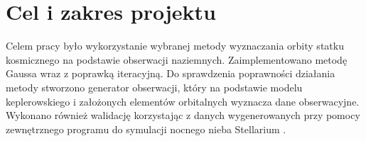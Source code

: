 \clearpage %
\section{Cel i zakres projektu}

Celem pracy było wykorzystanie wybranej metody wyznaczania orbity statku kosmicznego na podstawie obserwacji naziemnych. Zaimplementowano metodę Gaussa wraz z poprawką iteracyjną. Do sprawdzenia poprawności działania metody stworzono generator obserwacji, który na podstawie modelu keplerowskiego i założonych elementów orbitalnych wyznacza dane obserwacyjne. Wykonano również walidację korzystając z danych wygenerowanych przy pomocy zewnętrznego programu do symulacji nocnego nieba Stellarium \cite{Stellarium}.
